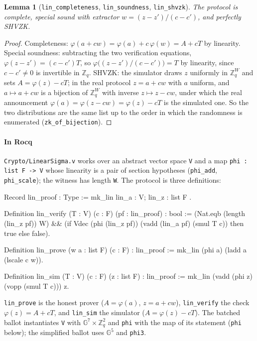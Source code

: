 \documentclass[11pt,a4paper]{article}
\newcommand{\G}{\mathbb{G}}
\newcommand{\Z}{\mathbb{Z}}
\newcommand{\rocq}[1]{\texttt{#1}}
\newtheorem{lemma}[theorem]{Lemma}
\theoremstyle{remark}
\begin{document}
\begin{lemma}[\rocq{lin\_completeness}, \rocq{lin\_soundness}, \rocq{lin\_shvzk}]
The protocol is complete, special sound with extractor $w = (z - z')/(c -
c')$, and perfectly SHVZK.
\end{lemma}
\begin{proof}
Completeness: $\varphi(a + cw) = \varphi(a) + c\,\varphi(w) = A + cT$ by
linearity. Special soundness: subtracting the two verification equations,
$\varphi(z - z') = (c - c') T$, so $\varphi\big((z - z')/(c - c')\big) =
T$ by linearity, since $c - c' \ne 0$ is invertible in $\Z_q$. SHVZK: the
simulator draws $z$ uniformly in $\Z_q^W$ and sets $A = \varphi(z) - cT$;
in the real protocol $z = a + cw$ with $a$ uniform, and $a \mapsto a + cw$
is a bijection of $\Z_q^W$ with inverse $z \mapsto z - cw$, under which the
real announcement $\varphi(a) = \varphi(z - cw) = \varphi(z) - cT$ is the
simulated one. So the two distributions are the same list up to the order
in which the randomness is enumerated (\rocq{zk\_of\_bijection}).
\end{proof}

\paragraph{In Rocq} \rocq{Crypto/LinearSigma.v} works over an abstract
vector space \rocq{V} and a map \rocq{phi : list F -> V} whose linearity
is a pair of section hypotheses (\rocq{phi\_add}, \rocq{phi\_scale}); the
witness has length \rocq{W}. The protocol is three definitions:
\begin{coq}
Record lin_proof : Type := mk_lin { lin_a : V; lin_z : list F }.

Definition lin_verify (T : V) (c : F) (pf : lin_proof) : bool :=
  (Nat.eqb (length (lin_z pf)) W) &&
  (if Vdec (phi (lin_z pf)) (vadd (lin_a pf) (smul T c)) then true else false).

Definition lin_prove (w a : list F) (c : F) : lin_proof :=
  mk_lin (phi a) (ladd a (lscale c w)).

Definition lin_sim (T : V) (c : F) (z : list F) : lin_proof :=
  mk_lin (vadd (phi z) (vopp (smul T c))) z.
\end{coq}
\rocq{lin\_prove} is the honest prover ($A = \varphi(a)$, $z = a + cw$),
\rocq{lin\_verify} the check $\varphi(z) = A + cT$, and \rocq{lin\_sim}
the simulator ($A = \varphi(z) - cT$). The batched ballot instantiates
\rocq{V} with $\G^{7} \times \Z_q^{2}$ and \rocq{phi} with the map of its
statement (\rocq{phi} below); the simplified ballot uses $\G^{5}$ and
\rocq{phi3}.
\end{document}
